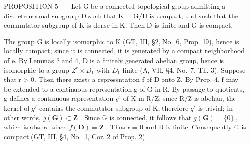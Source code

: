 PROPOSITION 5. --- Let G be a connected topological group admitting a discrete normal subgroup D such that K = G/D is compact, and such that the commutator subgroup of K is dense in K. Then D is finite and G is compact.

The group G is locally isomorphic to K (GT, III, §2, No.~6, Prop. 19), hence is locally compact; since it is connected, it is generated by a compact neighborhood of e. By Lemmas 3 and 4, D is a finitely generated abelian group, hence is isomorphic to a group \(Z^{r} \times D_{1}\) with \(D_{1}\) finite (A, VII, §4, No.~7, Th. 3). Suppose that r \textgreater{} 0. Then there exists a representation f of D onto Z. By Prop. 4, f may be extended to a continuous representation g of G in R. By passage to quotients, g defines a continuous representation \(g'\) of K in R/Z; since R/Z is abelian, the kernel of \(g'\) contains the commutator subgroup of K, therefore \(g'\) is trivial; in other words, \(g(\mathbf{G}) \subset \mathbf{Z}\) . Since G is connected, it follows that \(g(\mathbf{G}) = \{0\}\) , which is absurd since \(f(\mathbf{D}) = \mathbf{Z}\) . Thus r = 0 and D is finite. Consequently G is compact (GT, III, §4, No.~1, Cor. 2 of Prop. 2).
\relax{}
